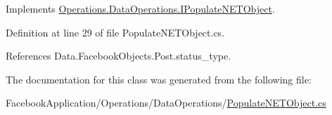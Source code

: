 Implements \hyperlink{interface_operations_1_1_data_operations_1_1_i_populate_n_e_t_object_a404db639d5476203f9aabfe79d10c6ab}{Operations.\+Data\+Operations.\+I\+Populate\+N\+E\+T\+Object}.



Definition at line 29 of file Populate\+N\+E\+T\+Object.\+cs.



References Data.\+Facebook\+Objects.\+Post.\+status\+\_\+type.



The documentation for this class was generated from the following file\+:\begin{DoxyCompactItemize}
\item 
Facebook\+Application/\+Operations/\+Data\+Operations/\hyperlink{_populate_n_e_t_object_8cs}{Populate\+N\+E\+T\+Object.\+cs}\end{DoxyCompactItemize}
